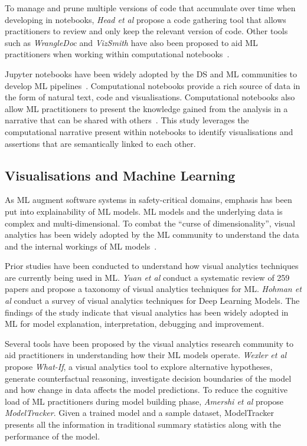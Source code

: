 To manage and prune multiple versions of code that accumulate over
time when developing in notebooks, \emph{Head et al} propose a code
gathering tool that allows practitioners to review and only keep the
relevant version of code. Other tools such as \textit{WrangleDoc} and
\textit{VizSmith} have also been proposed to aid ML practitioners when
working within computational notebooks~\cite{yang2021subtle,
  bavishi2021vizsmith}.

Jupyter notebooks have been widely adopted by the DS and ML
communities to develop ML
pipelines~\cite{wang2020assessing,pimentel2019large,quaranta2021kgtorrent}.
Computational notebooks provide a rich source of data in the form of
natural text, code and visualisations. Computational notebooks also
allow ML practitioners to present the knowledge gained from the
analysis in a narrative that can be shared with
others~\cite{rule2018exploration}. This study leverages the
computational narrative present within notebooks to identify
visualisations and assertions that are semantically linked to each
other.

\subsection{Visualisations and Machine Learning}\label{sec:visualisations}

As ML augment software systems in safety-critical domains, emphasis
has been put into explainability of ML models. ML models and the
underlying data is complex and multi-dimensional. To combat the
``curse of dimensionality'', visual analytics has been widely adopted
by the ML community to understand the data and the internal workings
of ML models~\cite{yuan2021survey,hohman2019visual,wexler2020if}.

Prior studies have been conducted to understand how visual analytics
techniques are currently being used in ML. \emph{Yuan et al} conduct a
systematic review of 259 papers and propose a taxonomy of visual
analytics techniques for ML. \emph{Hohman et al} conduct a survey of
visual analytics techniques for Deep Learning Models. The findings of
the study indicate that visual analytics has been widely adopted in ML
for model explanation, interpretation, debugging and improvement.

Several tools have been proposed by the visual analytics research
community to aid practitioners in understanding how their ML models
operate. \emph{Wexler et al} propose \textit{What-If}, a visual
analytics tool to explore alternative hypotheses, generate
counterfactual reasoning, investigate decision boundaries of the model
and how change in data affects the model predictions. To reduce the
cognitive load of ML practitioners during model building phase,
\emph{Amershi et al} propose \textit{ModelTracker}. Given a trained
model and a sample dataset, ModelTracker presents all the information
in traditional summary statistics along with the performance of the
model.

